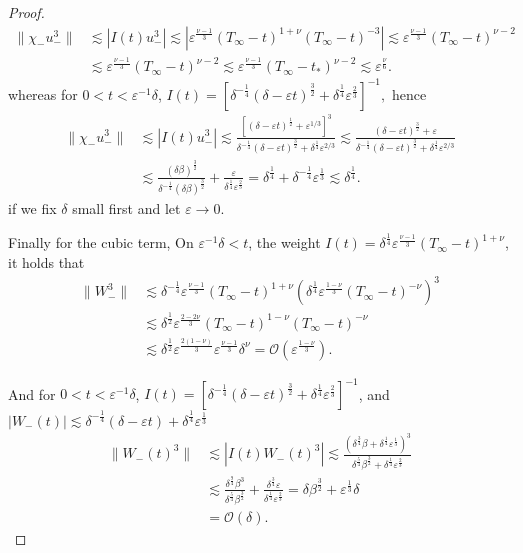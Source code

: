 \documentclass[letterpaper,11pt]{article}
\newcommand{\rmO}{\mathcal{O}}
\newcommand{\eps}{\varepsilon}
\newcommand{\lar}{ \lesssim }
\numberwithin{equation}{section}
\theoremstyle{plain}
\begin{document}
\begin{enumerate}
\begin{itemize}
\begin{enumerate}
\begin{proof}
\begin{align*}
\|\chi_-u_-^3\| &\lar | I(t)u_-^3| \lar |\eps^{\frac{\nu-1}{3}}(T_\infty-t)^{1+\nu}(T_\infty-t)^{-3} | \lar \eps^{\frac{\nu-1}{3}} (T_\infty-t)^{\nu-2} \\
& \lar \eps^{\frac{\nu-1}{3}}  (T_\infty - t)^{\nu-2} \lar \eps^{\frac{\nu-1}{3}} (T_\infty-t_*)^{\nu-2} \lar \eps^{\frac{\nu}{6}}.
\end{align*}
whereas for $0<t<\eps^{-1}\delta$, $I(t) =  [\delta^{-\frac{1}{4}} (\delta -\eps t)^{\frac{3}{2}}+\delta^{\frac{1}{4}}\eps^{\frac{2}{3}}]^{-1},$ hence
\begin{align*}
\| \chi_-u_-^3\| &\lar |I(t)u_-^3| \lar \frac{[(\delta-\eps t)^{\frac{1}{2}}+\eps^{1/3} ]^{3}}{ \delta^{-\frac{1}{4}}(\delta-\eps t)^{\frac{3}{2}} + \delta^{\frac{1}{4}}\eps^{2/3}} \lar \frac{ (\delta-\eps t)^{\frac{3}{2}}+ \eps}{\delta^{-\frac{1}{4}}(\delta-\eps t)^{\frac{3}{2}} + \delta^{\frac{1}{4}}\eps^{2/3}}\\
&\lar \frac{(\delta\beta)^{\frac{3}{2}}}{\delta^{-\frac{1}{4}}(\delta\beta)^{\frac{3}{2}} } + \frac{\eps}{\delta^{\frac{1}{4}} \eps^{\frac{2}{3}}}  = \delta^{\frac{1}{4}} + \delta^{-\frac{1}{4}}\eps^{\frac{1}{3}} \lar \delta^{\frac{1}{4}}.
\end{align*}
if we fix $\delta$ small first and let $\eps \to 0$.

Finally for the cubic term, 
On $\eps^{-1}\delta<t$, the weight $I(t) = \delta^{\frac{1}{4}}\eps^{\frac{\nu-1}{3}}(T_\infty-t)^{1+\nu}$, it holds that 
\begin{align*}
\|W_-^3\| &\lar \delta^{-\frac{1}{4}}\eps^{\frac{\nu-1}{3}}(T_\infty - t)^{1+\nu}(\delta^{\frac{1}{4}} \eps^{\frac{1-\nu}{3}} (T_\infty - t)^{-\nu})^3 \\
& \lar \delta^{\frac{1}{2}} \eps^{\frac{2-2\nu}{3}} (T_\infty-t)^{1-\nu}(T_\infty-t)^{-\nu} \\
& \lar \delta^{\frac{1}{2}}\eps^{\frac{2(1-\nu)}{3}} \eps^{\frac{\nu-1}{3}} \delta^{\nu}  = \rmO(\eps^{\frac{1-\nu}{3}}).
\end{align*}

And for $0<t<\eps^{-1}\delta$, $I(t) = [\delta^{-\frac{1}{4}}(\delta-\eps t)^{\frac{3}{2}} + \delta^{\frac{1}{4}}\eps^{\frac{2}{3}}]^{-1}$, and $|W_-(t)| \lar \delta^{-\frac{1}{4}}(\delta-\eps t)+\delta^{\frac{1}{4}} \eps^{\frac{1}{3}}$
\begin{align*}
\|W_-(t)^3\| &\lar |I(t)W_-(t)^3| \lar \frac{(\delta^{\frac{3}{4}}\beta + \delta^{\frac{1}{4}}\eps^{\frac{1}{3}} )^3}{\delta^{\frac{5}{4}}\beta^{\frac{3}{2}} +\delta^{\frac{1}{4}}\eps^{\frac{2}{3}} } \\
& \lar \frac{ \delta^{\frac{9}{4}}\beta^3  }{\delta^{\frac{5}{4}}\beta^{\frac{3}{2}}} + \frac{\delta^{\frac{3}{4}}\eps}{\delta^{\frac{1}{4}} \eps^{\frac{2}{3}}}  = \delta \beta^{\frac{3}{2}} + \eps^{\frac{1}{3}}\delta\\
& = \rmO(\delta).
\end{align*}
\end{proof}


\end{enumerate}
\end{itemize}
\end{enumerate}
\end{document}
